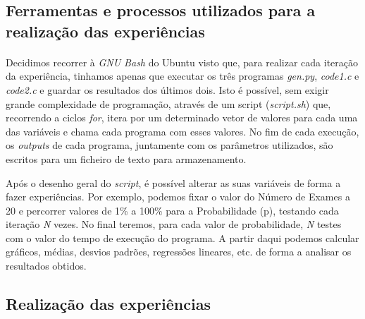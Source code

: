 \documentclass{article}
\begin{document}
\subsection{Ferramentas e processos utilizados para a realização das experiências}
\paragraph{}
Decidimos recorrer à \textit{GNU Bash} do Ubuntu visto que, para realizar cada iteração da experiência, tinhamos apenas que executar os três programas \textit{gen.py}, \textit{code1.c} e \textit{code2.c} e guardar os resultados dos últimos dois. Isto é possível, sem exigir grande complexidade de programação, através de um script (\textit{script.sh}) que, recorrendo a ciclos \textit{for}, itera por um determinado vetor de valores para cada uma das variáveis e chama cada programa com esses valores. No fim de cada execução, os \textit{outputs} de cada programa, juntamente com os parâmetros utilizados, são escritos para um ficheiro de texto para armazenamento.

Após o desenho geral do \textit{script}, é possível alterar as suas variáveis de forma a fazer experiências. Por exemplo, podemos fixar o valor do Número de Exames a 20 e percorrer valores de 1\% a 100\% para a Probabilidade (p), testando cada iteração \textit{N} vezes. No final teremos, para cada valor de probabilidade, \textit{N} testes com o valor do tempo de execução do programa. A partir daqui podemos calcular gráficos, médias, desvios padrões, regressões lineares, etc. de forma a analisar os resultados obtidos.

\subsection{Realização das experiências}
\end{document}
